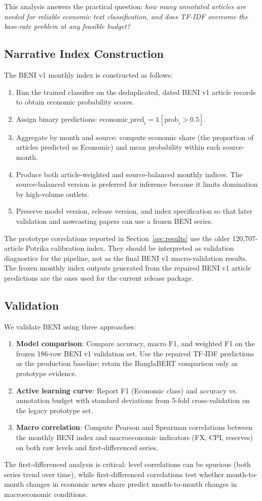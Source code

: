 This analysis answers the practical question: \textit{how many annotated articles are needed for reliable economic text classification, and does TF-IDF overcome the base-rate problem at any feasible budget?}

\subsection{Narrative Index Construction}

The BENI v1 monthly index is constructed as follows:

\begin{enumerate}
    \item Run the trained classifier on the deduplicated, dated BENI v1 article records to obtain economic probability scores.
    \item Assign binary predictions: $\text{economic\_pred}_i = \mathbb{1}[\text{prob}_i > 0.5]$.
    \item Aggregate by month and source: compute economic share (the proportion of articles predicted as Economic) and mean probability within each source-month.
    \item Produce both article-weighted and source-balanced monthly indices. The source-balanced version is preferred for inference because it limits domination by high-volume outlets.
    \item Preserve model version, release version, and index specification so that later validation and nowcasting papers can use a frozen BENI series.
\end{enumerate}

The prototype correlations reported in Section~\ref{sec:results} use the older 120,707-article Potrika calibration index. They should be interpreted as validation diagnostics for the pipeline, not as the final BENI v1 macro-validation results. The frozen monthly index outputs generated from the repaired BENI v1 article predictions are the ones used for the current release package.

\subsection{Validation}

We validate BENI using three approaches:

\begin{enumerate}
    \item \textbf{Model comparison}: Compare accuracy, macro F1, and weighted F1 on the frozen 186-row BENI v1 validation set. Use the repaired TF-IDF predictions as the production baseline; retain the BanglaBERT comparison only as prototype evidence.
    \item \textbf{Active learning curve}: Report F1 (Economic class) and accuracy vs. annotation budget with standard deviations from 5-fold cross-validation on the legacy prototype set.
    \item \textbf{Macro correlation}: Compute Pearson and Spearman correlations between the monthly BENI index and macroeconomic indicators (FX, CPI, reserves) on both raw levels and first-differenced series.
\end{enumerate}

The first-differenced analysis is critical: level correlations can be spurious (both series trend over time), while first-differenced correlations test whether month-to-month changes in economic news share predict month-to-month changes in macroeconomic conditions.
